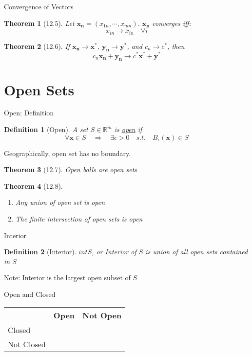\documentclass[a4paper,11pt]{article}
\newtheorem{defn}{Definition}
\newtheorem{thm}{Theorem}
\begin{document}
\begin{frame}[t]{Convergence of Vectors}
	\begin{thm}
		[12.5] Let $\mathbf{x_n}=(x_{1n},\cdots,x_{mn})$. $\mathbf{x_n}$ converges iff:
		\[
			x_{in} \rightarrow \bar x_{in} \quad \forall i
		\]
	\end{thm}
	\begin{thm}
		[12.6] If $\mathbf{x_n}\rightarrow\mathbf{x^\ast}$, $\mathbf{y_n} \rightarrow\mathbf{y^\ast}$, and $c_n\rightarrow c^\ast$, then\[
			c_n\mathbf{x_n}+\mathbf{y_n}\rightarrow c^\ast \mathbf{x^\ast} + \mathbf{y^\ast}
		\]
	\end{thm}
\end{frame}

\section{Open Sets} %
\label{sec:open_sets}
\begin{frame}[t]{Open: Definition}
	\begin{defn}
		[Open] A set $S\in\mathbb{R}^m$ is \uline{open} if \[
			\forall \mathbf{x}\in S \quad\Rightarrow\quad \exists \epsilon>0 \quad s.t.\quad B_\epsilon(\mathbf{x})\in S
		\]
	\end{defn}
	Geographically, open set has no boundary.
	\begin{thm}
		[12.7] Open balls are open sets
	\end{thm}
	\begin{thm}[12.8]
		\begin{enumerate}
			\item Any union of open set is open
			\item The finite intersection of open sets is open
		\end{enumerate}
	\end{thm}
\end{frame}

\begin{frame}[t]{Interior}
	\begin{defn}
		[Interior]
		$int S$, or \uline{Interior} of $S$ is union of all open sets contained in $S$
	\end{defn}
	Note: Interior is the largest open subset of $S$
	\begin{block}
		{Open and Closed}
		\begin{center}
			\begin{tabular}{l|ll}
			& Open & Not Open\\
			\hline
			Closed &&\\
			Not Closed &&
			\end{tabular}
		\end{center}
	\end{block}
\end{frame}
\end{document}
